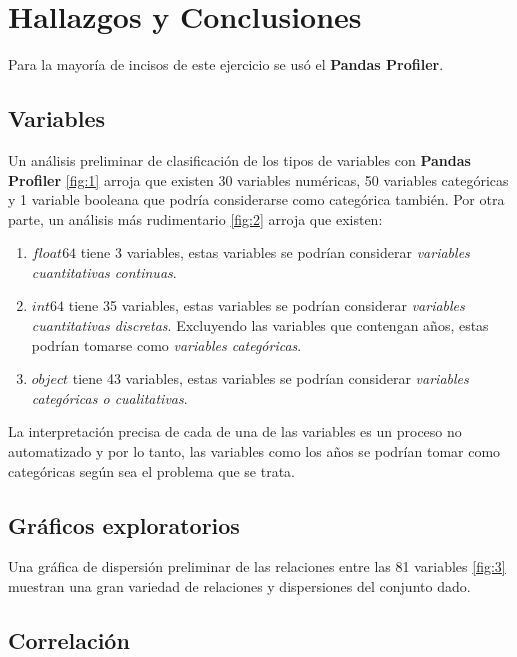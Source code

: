 \section{Hallazgos y Conclusiones}

Para la mayoría de incisos de este ejercicio se usó el \textbf{Pandas Profiler}. 

\subsection{Variables}

Un análisis preliminar de clasificación de los tipos de variables con \textbf{Pandas Profiler} \ref{fig:1} arroja que existen 30 variables numéricas, 50 variables categóricas y 1 variable booleana que podría considerarse como categórica también. Por otra parte, un análisis más rudimentario \ref{fig:2} arroja que existen: 
\begin{enumerate}
	\item $float64$ tiene 3 variables, estas variables se podrían considerar \textit{variables cuantitativas continuas}. 
	\item $int64$ tiene 35 variables, estas variables se podrían considerar \textit{variables cuantitativas discretas}. Excluyendo las variables que contengan años, estas podrían tomarse como \textit{variables categóricas}.  
	\item $object$ tiene 43 variables, estas variables se podrían considerar \textit{variables categóricas o cualitativas}.
\end{enumerate}

\begin{cajita}
	La interpretación precisa de cada de una de las variables es un proceso no automatizado y por lo tanto, las variables como los años se podrían tomar como categóricas según sea el problema que se trata. 
\end{cajita}

\subsection{Gráficos exploratorios}

Una gráfica de dispersión preliminar de las relaciones entre las 81 variables \ref{fig:3} muestran una gran variedad de relaciones y dispersiones del conjunto dado. 

\subsection{Correlación}

